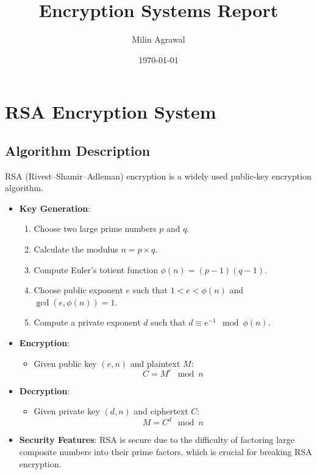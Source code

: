 \documentclass{article}
\title{Encryption Systems Report}
\author{Milin Agrawal}
\date{\today}
\begin{document}
\maketitle

\section{RSA Encryption System}

\subsection{Algorithm Description}
RSA (Rivest–Shamir–Adleman) encryption is a widely used public-key encryption algorithm.
\begin{itemize}
    \item \textbf{Key Generation}:
    \begin{enumerate}
        \item Choose two large prime numbers \( p \) and \( q \).
        \item Calculate the modulus \( n = p \times q \).
        \item Compute Euler's totient function \( \phi(n) = (p-1)(q-1) \).
        \item Choose public exponent \( e \) such that \( 1 < e < \phi(n) \) and \( \gcd(e, \phi(n)) = 1 \).
        \item Compute a private exponent \( d \) such that \( d \equiv e^{-1} \mod \phi(n) \).
    \end{enumerate}
    
    \item \textbf{Encryption}:
    \begin{itemize}
        \item Given public key \( (e, n) \) and plaintext \( M \):
        \[
        C = M^e \mod n
        \]
    \end{itemize}
    
    \item \textbf{Decryption}:
    \begin{itemize}
        \item Given private key \( (d, n) \) and ciphertext \( C \):
        \[
        M = C^d \mod n
        \]
    \end{itemize}
    
    \item \textbf{Security Features}:
    RSA is secure due to the difficulty of factoring large composite numbers into their prime factors, which is crucial for breaking RSA encryption.
\end{itemize}
\end{document}

